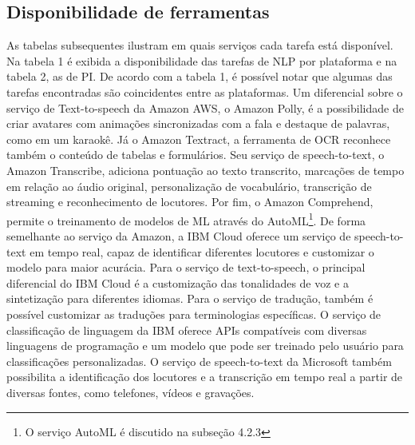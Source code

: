 \documentclass{article}
\begin{document}
\subsection{Disponibilidade de ferramentas}
 As tabelas subsequentes ilustram em quais serviços cada tarefa está disponível. Na tabela 1 é exibida a disponibilidade das tarefas de NLP por plataforma e na tabela 2, as de PI. De acordo com a tabela 1, é possível notar que algumas das tarefas encontradas são coincidentes entre as plataformas. Um diferencial sobre o serviço de Text-to-speech da Amazon AWS, o Amazon Polly, é a possibilidade de criar avatares com animações sincronizadas com a fala e destaque de palavras, como em um karaokê. Já o Amazon Textract, a ferramenta de OCR reconhece também o conteúdo de tabelas e formulários. Seu serviço de speech-to-text, o Amazon Transcribe, adiciona pontuação ao texto transcrito, marcações de tempo em relação ao áudio original, personalização de vocabulário, transcrição de streaming e reconhecimento de locutores. Por fim, o Amazon Comprehend, permite o treinamento de modelos de ML através do AutoML\footnote{O serviço AutoML é discutido na subseção 4.2.3}. De forma semelhante ao serviço da Amazon, a IBM Cloud oferece um serviço de speech-to-text em tempo real, capaz de identificar diferentes locutores e customizar o modelo para maior acurácia. Para o serviço de text-to-speech, o principal diferencial do IBM Cloud é a customização das tonalidades de voz e a sintetização para diferentes idiomas. Para o serviço de tradução, também é possível customizar as traduções para terminologias específicas. O serviço de classificação de linguagem da IBM oferece APIs compatíveis com diversas linguagens de programação e um modelo que pode ser treinado pelo usuário para classificações personalizadas. O serviço de speech-to-text da Microsoft também possibilita a identificação dos locutores e a transcrição em tempo real a partir de diversas fontes, como telefones, vídeos e gravações.
\end{document}
